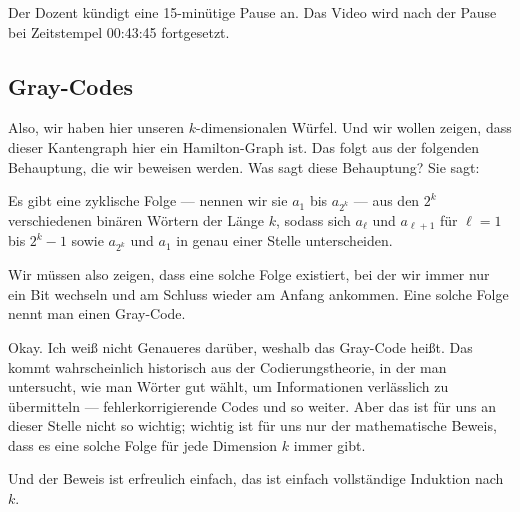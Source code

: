 \begin{lecture-break}[Vorlesungspause]
Der Dozent kündigt eine 15-minütige Pause an. Das Video wird nach der Pause bei Zeitstempel 00:43:45 fortgesetzt.
\end{lecture-break}

\subsection{Gray-Codes}

\begin{spoken-clean}[00:43:45 - 00:46:50]
Also, wir haben hier unseren $k$-dimensionalen Würfel. Und wir wollen zeigen, dass dieser Kantengraph hier ein Hamilton-Graph ist. Das folgt aus der folgenden Behauptung, die wir beweisen werden. Was sagt diese Behauptung? Sie sagt:

Es gibt eine zyklische Folge --- nennen wir sie $a_1$ bis $a_{2^k}$ --- aus den $2^k$ verschiedenen binären Wörtern der Länge $k$, sodass sich $a_\ell$ und $a_{\ell+1}$ für $\ell = 1$ bis $2^k - 1$ sowie $a_{2^k}$ und $a_1$ in genau einer Stelle unterscheiden.

Wir müssen also zeigen, dass eine solche Folge existiert, bei der wir immer nur ein Bit wechseln und am Schluss wieder am Anfang ankommen. Eine solche Folge nennt man einen Gray-Code.

Okay. Ich weiß nicht Genaueres darüber, weshalb das Gray-Code heißt. Das kommt wahrscheinlich historisch aus der Codierungstheorie, in der man untersucht, wie man Wörter gut wählt, um Informationen verlässlich zu übermitteln --- fehlerkorrigierende Codes und so weiter. Aber das ist für uns an dieser Stelle nicht so wichtig; wichtig ist für uns nur der mathematische Beweis, dass es eine solche Folge für jede Dimension $k$ immer gibt.

Und der Beweis ist erfreulich einfach, das ist einfach vollständige Induktion nach $k$.
\end{spoken-clean}

\begin{math-stroke}
\end{math-stroke}

